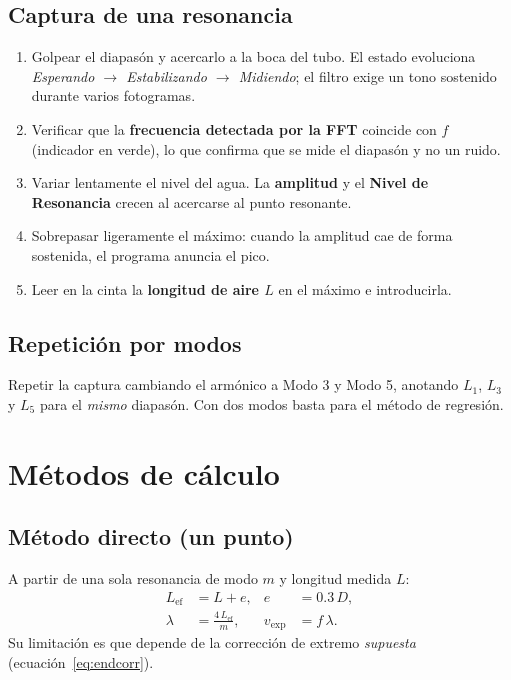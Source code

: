 \documentclass[11pt,a4paper]{article}
\newcommand{\vexp}{v_{\text{exp}}}
\begin{document}
\subsection{Captura de una resonancia}
\begin{enumerate}[nosep]
  \item Golpear el diapasón y acercarlo a la boca del tubo. El estado evoluciona
        \emph{Esperando $\to$ Estabilizando $\to$ Midiendo}; el filtro exige un tono
        sostenido durante varios fotogramas.
  \item Verificar que la \textbf{frecuencia detectada por la FFT} coincide con $f$
        (indicador en verde), lo que confirma que se mide el diapasón y no un ruido.
  \item Variar lentamente el nivel del agua. La \textbf{amplitud} y el \textbf{Nivel de
        Resonancia} crecen al acercarse al punto resonante.
  \item Sobrepasar ligeramente el máximo: cuando la amplitud cae de forma sostenida, el
        programa anuncia el pico.
  \item Leer en la cinta la \textbf{longitud de aire $L$} en el máximo e introducirla.
\end{enumerate}

\subsection{Repetición por modos}
Repetir la captura cambiando el armónico a Modo 3 y Modo 5, anotando $L_1$, $L_3$ y $L_5$
para el \emph{mismo} diapasón. Con dos modos basta para el método de regresión.

\section{Métodos de cálculo}

\subsection{Método directo (un punto)}
A partir de una sola resonancia de modo $m$ y longitud medida $L$:
\begin{align}
  L_{\text{ef}} &= L + e, & e &= 0.3\,D, \label{eq:Lef}\\
  \lambda &= \frac{4\,L_{\text{ef}}}{m}, &
  \vexp &= f\,\lambda. \label{eq:vexp_directo}
\end{align}
Su limitación es que depende de la corrección de extremo \emph{supuesta}
(ecuación~\eqref{eq:endcorr}).
\end{document}
